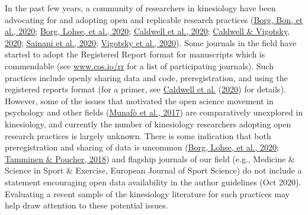 \documentclass[]{cik}%
\begin{document}
In the past few years, a community of researchers in kinesiology have
been advocating for and adopting open and replicable research practices
(\protect\hyperlink{ref-Borg_Bon_Sainani_Baguley_Tierney_Drovandi_2020}{Borg,
Bon, et al., 2020};
\protect\hyperlink{ref-Borg_Lohse_Sainani_2020}{Borg, Lohse, et al.,
2020}; \protect\hyperlink{ref-caldwell_moving_2020}{Caldwell et al.,
2020}; \protect\hyperlink{ref-Caldwell_Vigotsky_2020}{Caldwell \&
Vigotsky, 2020}; \protect\hyperlink{ref-sainani2020}{Sainani et al.,
2020};
\protect\hyperlink{ref-Vigotsky_Nuckols_Heathers_Krieger_Schoenfeld_Steele_2020}{Vigotsky
et al., 2020}). Some journals in the field have started to adopt the
Registered Report format for manuscripts which is commendable (see
\url{www.cos.io/rr} for a list of participating journals). Such
practices include openly sharing data and code, preregistration, and
using the registered reports format (for a primer, see
\protect\hyperlink{ref-caldwell_moving_2020}{Caldwell et al.}
(\protect\hyperlink{ref-caldwell_moving_2020}{2020}) for details).
However, some of the issues that motivated the open science movement in
psychology and other fields
(\protect\hyperlink{ref-munafo_manifesto_2017}{Munafò et al., 2017}) are
comparatively unexplored in kinesiology, and currently the number of
kinesiology researchers adopting open research practices is largely
unknown. There is some indication that both preregistration and sharing
of data is uncommon
(\protect\hyperlink{ref-Borg_Lohse_Sainani_2020}{Borg, Lohse, et al.,
2020}; \protect\hyperlink{ref-Tamminen_Poucher_2018}{Tamminen \&
Poucher, 2018}) and flagship journals of our field (e.g., Medicine \&
Science in Sport \& Exercise, European Journal of Sport Science) do not
include a statement encouraging open data availability in the author
guidelines (Oct 2020). Evaluating a recent sample of the kinesiology
literature for such practices may help draw attention to these potential
issues.
\end{document}
